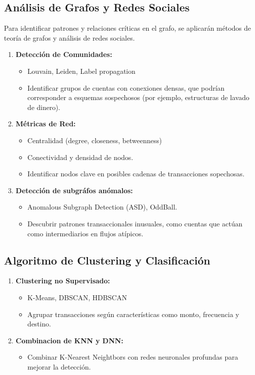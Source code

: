 \subsection{Análisis de Grafos y Redes Sociales}
Para identificar patrones y relaciones críticas en el grafo, se aplicarán métodos de teoría de grafos y análisis de redes sociales.
\begin{enumerate}
    \item \textbf{Detección de Comunidades:} 
    \begin{itemize}
        \item Louvain, Leiden, Label propagation
        \item Identificar grupos de cuentas con conexiones densas, que podrían corresponder a esquemas sospechosos (por ejemplo, estructuras de lavado de dinero).
    \end{itemize}
    \item \textbf{Métricas de Red:}
    \begin{itemize}
        \item Centralidad (degree, closeness, betweenness)
        \item Conectividad y densidad de nodos.
        \item Identificar nodos clave en posibles cadenas de transacciones sopechosas.
    \end{itemize}
    \item \textbf{Detección de subgráfos anómalos: }
    \begin{itemize}
        \item Anomalous Subgraph Detection (ASD), OddBall.
        \item Descubrir patrones transaccionales inusuales, como cuentas que actúan como intermediarios en flujos atípicos.
    \end{itemize}
\end{enumerate}

\subsection{Algoritmo de Clustering y Clasificación}
\begin{enumerate}
    \item \textbf{Clustering no Supervisado:} 
    \begin{itemize}
        \item K-Means, DBSCAN, HDBSCAN
        \item Agrupar transacciones según características como monto, frecuencia y destino.
    \end{itemize}
    \item \textbf{Combinacion de KNN y DNN:}
    \begin{itemize}
        \item Combinar K-Nearest Neightbors con redes neuronales profundas para mejorar la detección.
    \end{itemize}
\end{enumerate}


